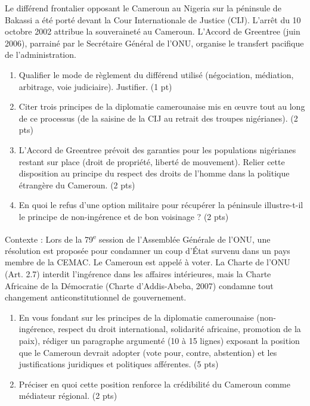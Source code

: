 \documentclass[11pt]{article}
\begin{document}
\begin{exercice}
Le différend frontalier opposant le Cameroun au Nigeria sur la péninsule de Bakassi a été porté devant la Cour Internationale de Justice (CIJ). L'arrêt du 10 octobre 2002 attribue la souveraineté au Cameroun. L'Accord de Greentree (juin 2006), parrainé par le Secrétaire Général de l'ONU, organise le transfert pacifique de l'administration.

\begin{enumerate}
    \item Qualifier le mode de règlement du différend utilisé (négociation, médiation, arbitrage, voie judiciaire). Justifier. \hfill (1 pt)
    \item Citer trois principes de la diplomatie camerounaise mis en œuvre tout au long de ce processus (de la saisine de la CIJ au retrait des troupes nigérianes). \hfill (2 pts)
    \item L'Accord de Greentree prévoit des garanties pour les populations nigérianes restant sur place (droit de propriété, liberté de mouvement). Relier cette disposition au principe du \og respect des droits de l'homme \fg{} dans la politique étrangère du Cameroun. \hfill (2 pts)
    \item En quoi le refus d'une option militaire pour récupérer la péninsule illustre-t-il le principe de \og non-ingérence \fg{} et de \og bon voisinage \fg{} ? \hfill (2 pts)
\end{enumerate}
\end{exercice}

\begin{exercice}
Contexte : Lors de la 79\textsuperscript{e} session de l'Assemblée Générale de l'ONU, une résolution est proposée pour condamner un coup d'État survenu dans un pays membre de la CEMAC. Le Cameroun est appelé à voter. La Charte de l'ONU (Art. 2.7) interdit l'ingérence dans les affaires intérieures, mais la Charte Africaine de la Démocratie (Charte d'Addis-Abeba, 2007) condamne tout changement anticonstitutionnel de gouvernement.

\begin{enumerate}
    \item En vous fondant sur les principes de la diplomatie camerounaise (non-ingérence, respect du droit international, solidarité africaine, promotion de la paix), rédiger un paragraphe argumenté (10 à 15 lignes) exposant la position que le Cameroun devrait adopter (vote pour, contre, abstention) et les justifications juridiques et politiques afférentes. \hfill (5 pts)
    \item Préciser en quoi cette position renforce la crédibilité du Cameroun comme médiateur régional. \hfill (2 pts)
\end{enumerate}
\end{exercice}
\end{document}
